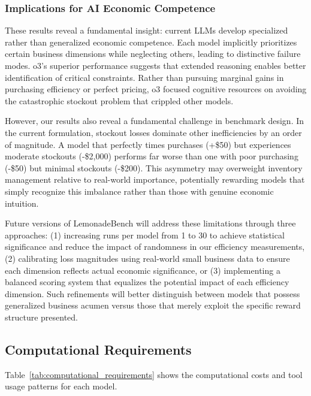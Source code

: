 \documentclass[11pt]{article}
\begin{document}
\subsubsection{Implications for AI Economic Competence}

These results reveal a fundamental insight: current LLMs develop specialized rather than generalized economic competence.
Each model implicitly prioritizes certain business dimensions while neglecting others, leading to distinctive failure modes.
o3's superior performance suggests that extended reasoning enables better identification of critical constraints.
Rather than pursuing marginal gains in purchasing efficiency or perfect pricing, o3 focused cognitive resources on avoiding the catastrophic stockout problem that crippled other models.

However, our results also reveal a fundamental challenge in benchmark design.
In the current formulation, stockout losses dominate other inefficiencies by an order of magnitude. A model that perfectly times purchases (+\$50) but experiences moderate stockouts (-\$2,000) performs far worse than one with poor purchasing (-\$50) but minimal stockouts (-\$200).
This asymmetry may overweight inventory management relative to real-world importance, potentially rewarding models that simply recognize this imbalance rather than those with genuine economic intuition.

Future versions of LemonadeBench will address these limitations through three approaches: (1) increasing runs per model from 1 to 30 to achieve statistical significance and reduce the impact of randomness in our efficiency measurements, (2) calibrating loss magnitudes using real-world small business data to ensure each dimension reflects actual economic significance, or (3) implementing a balanced scoring system that equalizes the potential impact of each efficiency dimension.
Such refinements will better distinguish between models that possess generalized business acumen versus those that merely exploit the specific reward structure presented.

\subsection{Computational Requirements}

Table~\ref{tab:computational_requirements} shows the computational costs and tool usage patterns for each model.


\end{document}
